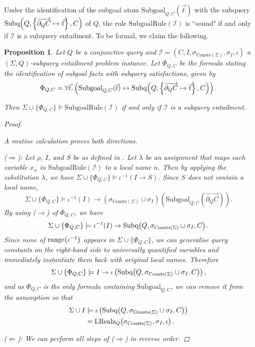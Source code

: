 \documentclass[12pt]{report}
\theoremstyle{plain}
\newtheorem{proposition}[theorem]{Proposition}
\theoremstyle{definition}
\def\Consts{{\mathrm{Consts}}}
\newcommand{\range}[1]{\ensuremath{\normalfont{\operatorname{range}}\!\left( #1 \right)}}
\newcommand{\Subq}[3]{\ensuremath{\normalfont{\textrm{Subq}}\!\left( #1, #2, #3 \right)}}
\newcommand{\LRealz}[2]{\ensuremath{\normalfont{\textrm{LRealz}}_{ #1 }\!\left( #2 \right)}}
\begin{document}
Under the identification of the subgoal atom $\mathrm{Subgoal}_{Q, C}(\vec{t})$ with the subquery $\Subq{Q}{\left\{ \overrightarrow{\partial_Q C} \mapsto \vec{t} \right\}}{C}$ of $Q$, the rule $\mathrm{SubgoalRule}(\mathcal{I})$ is ``sound" if and only if $\mathcal{I}$ is a subquery entailment. To be formal, we claim the following.

\begin{proposition}
\label{proposition:subgoal-captures-subquery-fulfilment}
  Let $Q$ be a conjunctive query and $\mathcal{I} = (C, I, \sigma_{\Consts(\Sigma)}, \sigma_I, \iota)$ a $(\Sigma, Q)$-subquery entailment problem instance. Let $\Phi_{Q, C}$ be the formula stating the identification of subgoal facts with subquery satisfactions, given by $$
    \Phi_{Q, C} = \forall \vec{t}. \left( \mathrm{Subgoal}_{Q,C}(\vec{t}) \leftrightarrow \Subq{Q}{\left\{ \overrightarrow{\partial_Q C} \mapsto \vec{t} \right\}}{C} \right).
  $$
  
  Then $\Sigma \cup \{ \Phi_{Q, C} \} \models \mathrm{SubgoalRule}(\mathcal{I})$ if and only if $\mathcal{I}$ is a subquery entailment.
  \begin{proof} $ $\par
    A routine calculation proves both directions.

    ($\Longrightarrow$):
      Let $\rho$, $I$, and $S$ be as defined in . Let $\lambda$ be an assignment that maps each variable $x_n$ in $\mathrm{SubgoalRule}(\mathcal{I})$ to a local name $n$. Then by applying the substitution $\lambda$, we have $\Sigma \cup \{ \Phi_{Q, C} \} \models \iota^{-1}(I \rightarrow S)$. Since $S$ does not contain a local name, $$
      \Sigma \cup \{ \Phi_{Q, C} \} \models \iota^{-1}(I) \rightarrow (\sigma_{\Consts(\Sigma)} \cup \sigma_I)\left(\mathrm{Subgoal}_{Q, C}\left(\overrightarrow{\partial_Q C}\right)\right).
      $$
      By using ($\rightarrow$) of $\Phi_{Q,C}$, we have
      $$
      \Sigma \cup \{ \Phi_{Q, C} \} \models \iota^{-1}(I) \rightarrow \Subq{Q}{\sigma_{\Consts(\Sigma)} \cup \sigma_I}{C}.
      $$
      Since none of $\range{\iota^{-1}}$ appears in $\Sigma \cup \{\Phi_{Q, C}\}$, we can generalise query constants on the right-hand side to universally quantified variables and immediately instantiate them back with original local names. Therefore
      $$
      \Sigma \cup \{ \Phi_{Q, C} \} \models I \rightarrow \iota\left(\Subq{Q}{\sigma_{\Consts(\Sigma)} \cup \sigma_I}{C}\right),
      $$
      and as $\Phi_{Q, C}$ is the only formula containing $\mathrm{Subgoal}_{Q, C}$, we can remove it from the assumption so that \begin{align*}
        \Sigma \cup I
          &\models \iota\left(\Subq{Q}{\sigma_{\Consts(\Sigma)} \cup \sigma_I}{C}\right) \\
          &= \LRealz{Q}{\sigma_{\Consts(\Sigma)}, \sigma_I, \iota}.
      \end{align*}

    ($\Longleftarrow$): We can perform all steps of ($\Longrightarrow$) in reverse order.
  \end{proof}
\end{proposition}
\end{document}
